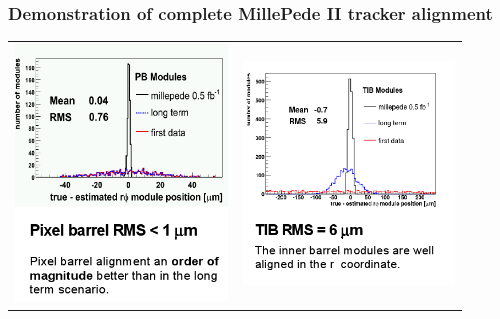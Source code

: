 \documentclass[compress]{beamer}
\begin{document}
\begin{frame}
\frametitle{Demonstration of complete MillePede II tracker alignment}
\begin{center}
\begin{tabular}{p{0.45\linewidth} p{0.45\linewidth}}
\includegraphics[width=\linewidth]{tracker_alignment_milestone1.png} &
\includegraphics[width=\linewidth]{tracker_alignment_milestone2.png}
\end{tabular}
\end{center}
\begin{itemize}


\end{itemize}
\end{frame}
\end{document}
